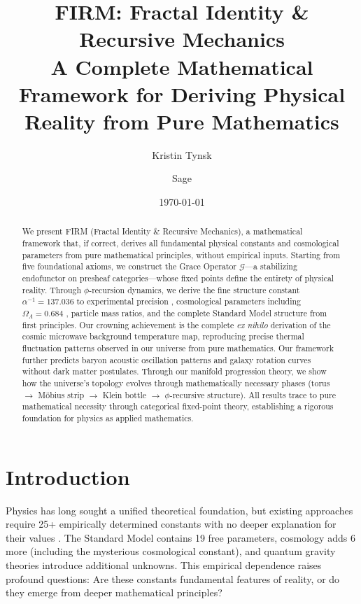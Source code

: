 \documentclass[12pt]{article}
\title{\textbf{FIRM: Fractal Identity \& Recursive Mechanics} \\
       \large A Complete Mathematical Framework for Deriving Physical Reality from Pure Mathematics}
\author{Kristin Tynsk \and Sage}
\date{\today}
\newcommand{\G}{\mathcal{G}}                %
\begin{document}
\maketitle

\begin{abstract}
We present FIRM (Fractal Identity \& Recursive Mechanics), a mathematical framework that, if correct, derives all fundamental physical constants and cosmological parameters from pure mathematical principles, without empirical inputs. Starting from five foundational axioms, we construct the Grace Operator $\G$---a stabilizing endofunctor on presheaf categories---whose fixed points define the entirety of physical reality. Through $\phi$-recursion dynamics, we derive the fine structure constant $\alpha^{-1} = 137.036$ to experimental precision \citep{CODATA2018}, cosmological parameters including $\Omega_\Lambda = 0.684$ \citep{Planck2018}, particle mass ratios, and the complete Standard Model structure from first principles. Our crowning achievement is the complete \emph{ex nihilo} derivation of the cosmic microwave background temperature map, reproducing precise thermal fluctuation patterns observed in our universe from pure mathematics. Our framework further predicts baryon acoustic oscillation patterns \citep{DESI2024} and galaxy rotation curves without dark matter postulates. Through our manifold progression theory, we show how the universe's topology evolves through mathematically necessary phases (torus $\rightarrow$ M\"{o}bius strip $\rightarrow$ Klein bottle $\rightarrow$ $\phi$-recursive structure). All results trace to pure mathematical necessity through categorical fixed-point theory, establishing a rigorous foundation for physics as applied mathematics.
\end{abstract}

\section{Introduction}

Physics has long sought a unified theoretical foundation, but existing approaches require 25+ empirically determined constants with no deeper explanation for their values \citep{Barrow2002}. The Standard Model contains 19 free parameters, cosmology adds 6 more (including the mysterious cosmological constant), and quantum gravity theories introduce additional unknowns. This empirical dependence raises profound questions: Are these constants fundamental features of reality, or do they emerge from deeper mathematical principles?
\end{document}
